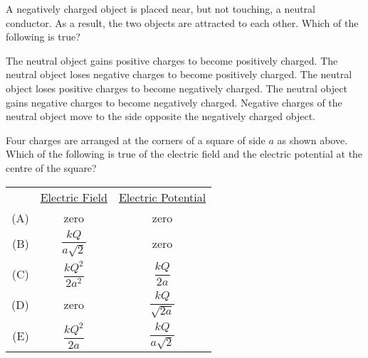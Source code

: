 \documentclass{../../oss-apphys-exam}
\begin{document}
\begin{questions}
  \question A negatively charged object is placed near, but not touching, a
  neutral conductor. As a result, the two objects are attracted to each other.
  Which of the following is true?
  \begin{choices}
    \choice The neutral object gains positive charges to become positively
    charged.
    \choice The neutral object loses negative charges to become positively
    charged.
    \choice The neutral object loses positive charges to become negatively
    charged.
    \choice The neutral object gains negative charges to become negatively
    charged.
    \choice Negative charges of the neutral object move to the side opposite
    the negatively charged object.
  \end{choices}
  \newpage
  
  \question Four charges are arranged at the corners of a square of side $a$ as
  shown above. Which of the following is true of the electric field and the
  electric potential at the centre of the square?

  \begin{tabular}{rcc}
    & \underline{Electric Field} & \underline{Electric Potential}\\
    (A) & zero & zero \\
    (B) & $\dfrac{kQ}{a\sqrt 2}$ & zero \\
    (C) & $\dfrac{kQ^2}{2a^2}$ &  $\dfrac{kQ}{2a}$\\
    (D) & zero &  $\dfrac{kQ}{\sqrt{2a}}$\\
    (E) & $\dfrac{kQ^2}{2a}$ & $\dfrac{kQ}{a\sqrt 2}$
  \end{tabular}
  \newpage  


  
  \classkickFRQinstructions
  

\end{questions}
\end{document}
